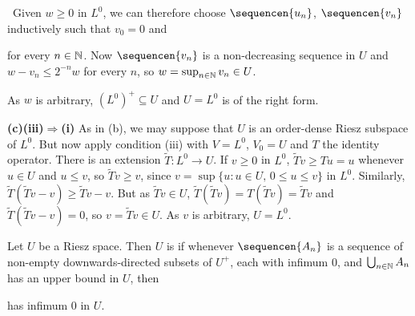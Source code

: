 {\medskip

\quad\grheadc\ Given $w\ge 0$ in $L^0$, we can therefore choose
$\sequencen{u_n}$, $\sequencen{v_n}$ inductively such that $v_0=0$ and


\noindent for every $n\in\Bbb N$.   Now $\sequencen{v_n}$ is a
non-decreasing sequence in $U$ and $w-v_n\le 2^{-n}w$ for every $n$, so
$w=\sup_{n\in\Bbb N}v_n\in U$.

As $w$ is arbitrary, $(L^0)^+\subseteq U$ and $U=L^0$ is of the right
form.

\medskip

{\bf (c)(iii)$\Rightarrow$(i)} As in (b), we may suppose that $U$ is an
order-dense Riesz subspace of $L^0$.   But now apply condition (iii)
with $V=L^0$, $V_0=U$ and $T$ the identity operator.   There is an
extension $\tilde T:L^0\to U$.   If $v\ge 0$ in $L^0$, $\tilde Tv\ge Tu=u$
whenever
$u\in U$ and $u\le v$, so $\tilde Tv\ge v$,
since $v=\sup\{u:u\in U,\,0\le u\le v\}$ in $L^0$.   Similarly,
$\tilde T(\tilde Tv-v)\ge\tilde Tv-v$.   But as $\tilde Tv\in U$,
$\tilde T(\tilde Tv)=T(\tilde Tv)=\tilde Tv$ and
$\tilde T(\tilde Tv-v)=0$, so
$v=\tilde Tv\in U$.   As $v$ is arbitrary, $U=L^0$.
}%

 Let $U$ be a Riesz space.   Then $U$ is {\bf
\wsid} if whenever $\sequencen{A_n}$ is a sequence of non-empty
downwards-directed subsets of $U^+$, each with infimum $0$, and
$\bigcup_{n\in\Bbb N}A_n$ has an upper bound in $U$, then


\noindent has infimum $0$ in $U$.


